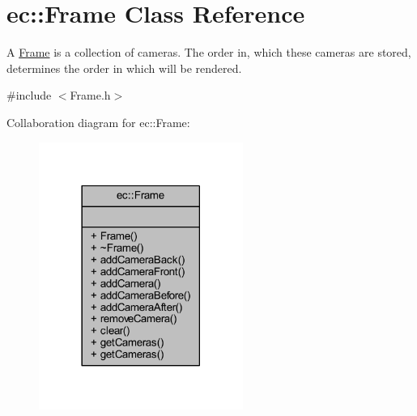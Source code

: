 \hypertarget{classec_1_1_frame}{}\section{ec\+:\+:Frame Class Reference}
\label{classec_1_1_frame}


A \mbox{\hyperlink{classec_1_1_frame}{Frame}} is a collection of cameras. The order in, which these cameras are stored, determines the order in which will be rendered.  




{\ttfamily \#include $<$Frame.\+h$>$}



Collaboration diagram for ec\+:\+:Frame\+:\nopagebreak
\begin{figure}[H]
\begin{center}
\leavevmode
\includegraphics[width=189pt]{classec_1_1_frame__coll__graph}
\end{center}
\end{figure}
